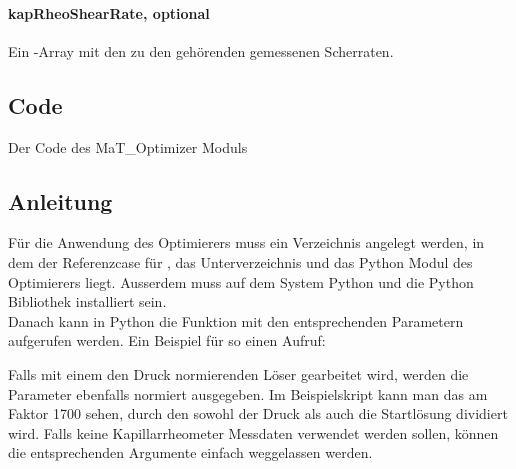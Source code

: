 \paragraph{kapRheoShearRate, optional}
Ein -Array mit den zu den  gehörenden gemessenen Scherraten.
\subsection{Code}
\label{Appendix:Python:Code}
Der Code des MaT\_Optimizer Moduls

%
\subsection{Anleitung}
\label{Appendix:Python:Anleitung}
Für die Anwendung des Optimierers muss ein Verzeichnis angelegt werden, in dem der Referenzcase für \openfoam{}, das Unterverzeichnis  und das Python Modul des Optimierers liegt.
Ausserdem muss auf dem System Python und die Python Bibliothek  installiert sein.\\
Danach kann in Python die Funktion  mit den entsprechenden Parametern aufgerufen werden.
Ein Beispiel für so einen Aufruf:

Falls mit einem den Druck normierenden Löser gearbeitet wird, werden die Parameter ebenfalls normiert ausgegeben. Im Beispielskript kann man das am Faktor 1700 sehen, durch den sowohl der Druck als auch die Startlösung dividiert wird.
Falls keine Kapillarrheometer Messdaten verwendet werden sollen, können die entsprechenden Argumente einfach weggelassen werden.
